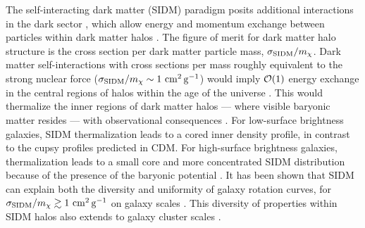 The self-interacting dark matter (SIDM) paradigm posits additional interactions in the dark sector \citep[\eg,][]{1992ApJ...398...43C,Spergel:1999mh,Dave:2000ar,Firmani:2000ce}, which allow energy and momentum exchange between particles within dark matter halos \citep[see][for a recent review]{Tulin:2017ara}. The figure of merit for dark matter halo structure is the cross section per dark matter particle mass, $\sigma_{\rm SIDM}/m_\chi$.
Dark matter self-interactions with cross sections per mass roughly equivalent to the strong nuclear force ($\sigma_{\rm SIDM}/m_\chi \sim 1 \mathrm{\,\mathrm{\,cm}^2\mathrm{\,g}^{-1}}$) would imply ${\cal O}(1)$ energy exchange in the central regions of halos within the age of the universe \citep{2012MNRAS.423.3740V,2013MNRAS.431L..20Z,Peter:2013,Rocha:2012jg}. This  would thermalize the inner regions of dark matter halos --- where visible baryonic matter resides --- with observational consequences \citep[\eg][]{Kaplinghat:2013xca}. For low-surface brightness galaxies, SIDM thermalization leads to a cored inner density profile, in contrast to the cupsy profiles predicted in CDM. For high-surface brightness galaxies, thermalization leads to a small core and more concentrated SIDM distribution because of the presence of the baryonic potential \citep{Kaplinghat:2015aga}. It has been shown that SIDM can explain both the diversity and uniformity of galaxy rotation curves, for $\sigma_{\rm SIDM}/m_\chi \gtrsim 1\mathrm{\,\mathrm{\,cm}^2\mathrm{\,g}^{-1}}$ on galaxy scales \citep{Kamada:2016euw,Creasey:2016jaq,Ren:2018jpt}. This diversity of properties within SIDM halos also extends to galaxy cluster scales \citep{Robertson:2017mgj}.

